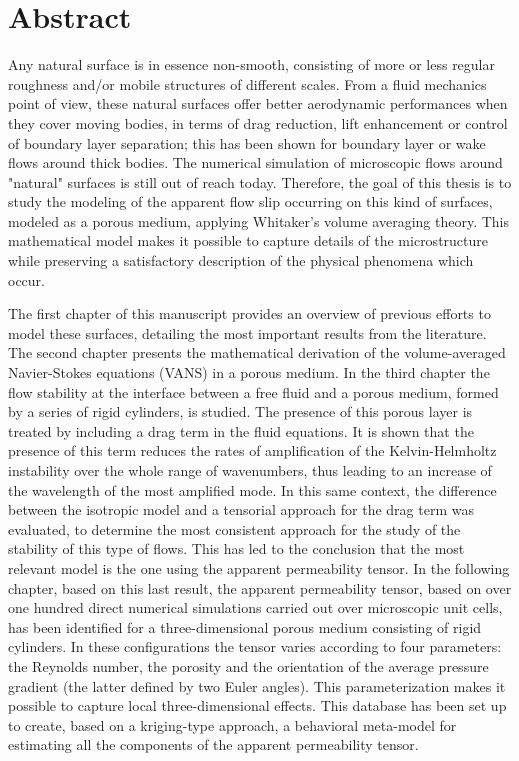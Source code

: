 \chapter*{Abstract}

Any natural surface is in essence non-smooth, consisting of more or less regular roughness and/or mobile structures of different scales. From a fluid mechanics point of view, these natural surfaces offer better aerodynamic performances when they cover moving bodies, in terms of drag reduction, lift enhancement or control of boundary layer separation; this has been shown for boundary layer or wake flows around thick bodies. The numerical simulation of microscopic flows around "natural" surfaces is still out of reach today. Therefore, the goal of this thesis is to study the modeling of the apparent flow slip occurring on this kind of surfaces, modeled as a porous medium, applying Whitaker's volume averaging theory. This mathematical model makes it possible to capture details of the microstructure while preserving a satisfactory description of the physical phenomena which occur. 

The first chapter of this manuscript provides an overview of previous efforts to model these surfaces, detailing the most important results from the literature. The second chapter presents the mathematical derivation of the volume-averaged Navier-Stokes equations (VANS) in a porous medium. In the third chapter the flow stability at the interface between a free fluid and a porous medium, formed by a series of rigid cylinders, is studied. The presence of this porous layer is treated by including a drag term in the fluid equations. It is shown that the presence of this term reduces the rates of amplification of the Kelvin-Helmholtz instability over the whole range of wavenumbers, thus leading to an increase of the wavelength of the most amplified mode. In this same context, the difference between the isotropic model and a tensorial approach for the drag term was evaluated, to determine the most consistent approach for the study of the stability of this type of flows. This has led to the conclusion that the most relevant model is the one using the apparent permeability tensor. In the following chapter, based on this last result, the apparent permeability tensor, based on over one hundred direct numerical simulations carried out over microscopic unit cells, has been identified for a three-dimensional porous medium consisting of rigid cylinders. In these configurations the tensor varies according to four parameters: the Reynolds number, the porosity and the orientation of the average pressure gradient (the latter defined by two Euler angles). This parameterization makes it possible to capture local three-dimensional effects. This database has been set up to create, based on a kriging-type approach, a behavioral meta-model for estimating all the components of the apparent permeability tensor.

